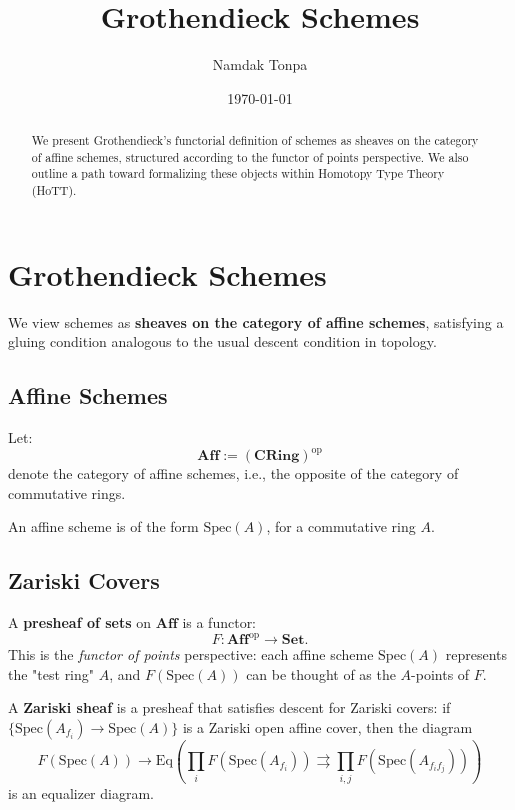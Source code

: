 \documentclass{article}
\begin{document}
\title{Grothendieck Schemes}
\author{Namdak Tonpa}
\date{\today}

\maketitle

\begin{abstract}
We present Grothendieck’s functorial definition of schemes as sheaves on the category of affine schemes, structured according to the functor of points perspective. We also outline a path toward formalizing these objects within Homotopy Type Theory (HoTT).
\end{abstract}

\section{Grothendieck Schemes}

We view schemes as \textbf{sheaves on the category of affine schemes}, satisfying a gluing condition analogous to the usual descent condition in topology.

\subsection{Affine Schemes}

Let:
\[
\mathbf{Aff} := (\mathbf{CRing})^{\mathrm{op}}
\]
denote the category of affine schemes, i.e., the opposite of the category of commutative rings.

An affine scheme is of the form $\mathrm{Spec}(A)$, for a commutative ring $A$.

\subsection{Zariski Covers}

A \textbf{presheaf of sets} on $\mathbf{Aff}$ is a functor:
\[
F : \mathbf{Aff}^{\mathrm{op}} \to \mathbf{Set}.
\]
This is the \emph{functor of points} perspective: each affine scheme $\mathrm{Spec}(A)$ represents the "test ring" $A$, and $F(\mathrm{Spec}(A))$ can be thought of as the $A$-points of $F$.

A \textbf{Zariski sheaf} is a presheaf that satisfies descent for Zariski covers: if $\{ \mathrm{Spec}(A_{f_i}) \to \mathrm{Spec}(A) \}$ is a Zariski open affine cover, then the diagram
\[
F(\mathrm{Spec}(A)) \to \mathrm{Eq} \left( \prod_i F(\mathrm{Spec}(A_{f_i})) \rightrightarrows \prod_{i,j} F(\mathrm{Spec}(A_{f_i f_j})) \right)
\]
is an equalizer diagram.
\end{document}
